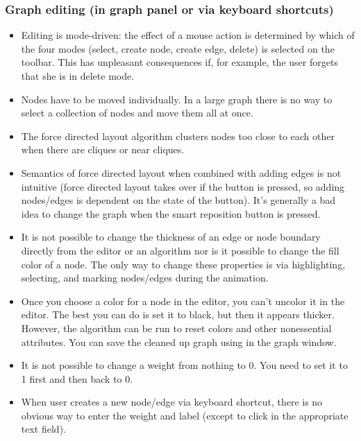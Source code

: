 \subsubsection*{Graph editing (in graph panel or via keyboard shortcuts)}

\begin{itemize}

\item Editing is mode-driven: the effect of a mouse action is determined by
  which of the four modes (select, create node, create edge, delete) is
  selected on the toolbar. This has unpleasant consequences if, for example,
  the user forgets that she is in delete mode.

\item Nodes have to be moved individually. In a large graph there is no way
  to select a collection of nodes and move them all at once.

\item The force directed layout algorithm clusters nodes too close to each
  other when there are cliques or near cliques.

\item Semantics of force directed layout when combined with adding edges is
  not intuitive (force directed layout takes over if the button is pressed,
  so adding nodes/edges is dependent on the state of the button). It's
  generally a bad idea to change the graph when the smart reposition button
  is pressed.

\item It is not possible to change the thickness of an edge or node boundary
  directly from the editor or an algorithm nor is it possible to change the
  fill color of a node.  The only way to change these properties is via
  highlighting, selecting, and marking nodes/edges during the animation.

\item Once you choose a color for a node in the editor, you can't uncolor it in
  the editor. The best you can do is set it to black, but then it appears
  thicker. However, the algorithm  can be run to
  reset colors and other nonessential attributes. You can save the cleaned up
  graph using  in the graph window.

\item It is not possible to change a weight from nothing to 0. You need to
  set it to 1 first and then back to 0.

\item When user creates a new node/edge via keyboard shortcut, there is no
  obvious way to enter the weight and label (except to click in the
  appropriate text field).

\end{itemize}

